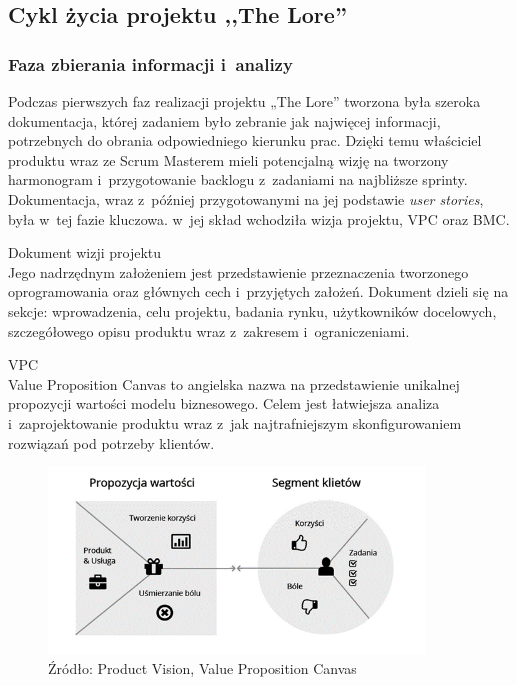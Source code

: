 \documentclass[oneside,polski,logo]{amuthesis}
\begin{document}
\subsection{Cykl życia projektu ,,The Lore''}

\subsubsection{Faza zbierania informacji i~analizy}

Podczas pierwszych faz realizacji projektu „The Lore” tworzona była szeroka dokumentacja, której zadaniem było zebranie jak najwięcej informacji, potrzebnych do obrania odpowiedniego kierunku prac. Dzięki temu właściciel produktu wraz ze Scrum Masterem mieli potencjalną wizję na tworzony harmonogram i~przygotowanie backlogu z~zadaniami na najbliższe sprinty. Dokumentacja, wraz z~później przygotowanymi na jej podstawie \emph{user stories}, była w~tej fazie kluczowa. w~jej skład wchodziła wizja projektu, VPC oraz BMC.

Dokument wizji projektu\\
Jego nadrzędnym założeniem jest przedstawienie przeznaczenia tworzonego oprogramowania oraz głównych cech i~przyjętych założeń. Dokument dzieli się na sekcje: wprowadzenia, celu projektu, badania rynku, użytkowników docelowych, szczegółowego opisu produktu wraz z~zakresem i~ograniczeniami.

VPC\\
Value Proposition Canvas to angielska nazwa na przedstawienie unikalnej propozycji wartości modelu biznesowego. Celem jest łatwiejsza analiza i~zaprojektowanie produktu wraz z~jak najtrafniejszym skonfigurowaniem rozwiązań pod potrzeby klientów. \cite{VPC}

\begin{figure}[h]
	\centering
	\includegraphics[width=10cm]{images/hyps/VPC.png}
	\caption{Źródło: Product Vision, Value Proposition Canvas}
\end{figure}
\end{document}
